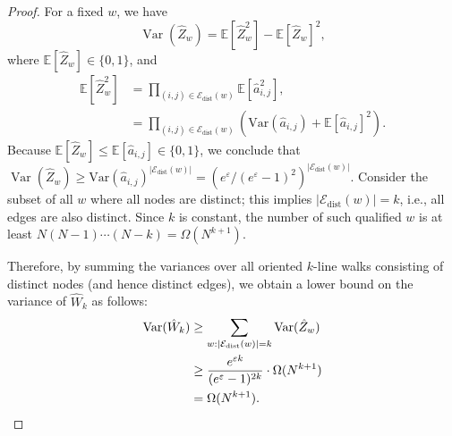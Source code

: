 \begin{proof}
For a fixed $w$, we have
\begin{equation*}
    \operatorname{Var}(\hat{Z}_{w})
= \mathbb{E}[ \hat{Z}_{w}^{2} ] - \mathbb{E}[\hat{Z}_{w}]^{2},
\end{equation*}
where $\mathbb{E}[\hat{Z}_{w}] \in \{0,1\}$, and 
\begin{align*}
    \mathbb{E}[\hat{Z}_{w}^{2}] 
    &= \prod_{(i,j)\in \mathcal{E}_{\mathrm{dist}}(w)}\mathbb{E}[\hat{a}_{i,j}^2], \\
    &= \prod_{(i,j)\in \mathcal{E}_{\mathrm{dist}}(w)} (\mathrm{Var}(\hat{a}_{i,j}) + \mathbb{E}[\hat{a}_{i,j}]^2).
\end{align*}
Because $\mathbb{E}[\hat{Z}_{w}] \leq \mathbb{E}[\hat{a}_{i,j}] \in \{0, 1\}$, we conclude that $\operatorname{Var}(\hat{Z}_{w}) \geq \mathrm{Var}(\hat{a}_{i,j})^{|\mathcal{E}_\mathrm{dist}(w)|} = (e^\varepsilon/(e^\varepsilon{-}1)^2)^{|\mathcal{E}_\mathrm{dist}(w)|}$. 
Consider the subset of all $w$ where all nodes are distinct; this implies $|\mathcal{E}_\mathrm{dist}(w)| = k$, i.e., all edges are also distinct. 
Since $k$ is constant, the number of such qualified $w$ is at least $N(N{-}1)\cdots(N{-}k) = \Omega(N^{k+1})$.




Therefore, by summing the variances over all oriented $k$-line walks consisting of distinct nodes (and hence distinct edges), we obtain a lower bound on the variance of $\hat{W}_k$ as follows:
\begin{align*}
    \mathrm{Var}(\hat{W}_k)
    &\geq \sum_{w: |\mathcal{E}_{\mathrm{dist}}(w)| = k} \mathrm{Var}(\hat{Z}_{w}) \\
    &\geq  \frac{e^{\varepsilon k}}{(e^\varepsilon-1)^{2k}} \cdot \Omega(N^{k+1}) \\
    &= \Omega(N^{k+1}). \qedhere
\end{align*}
\end{proof}
